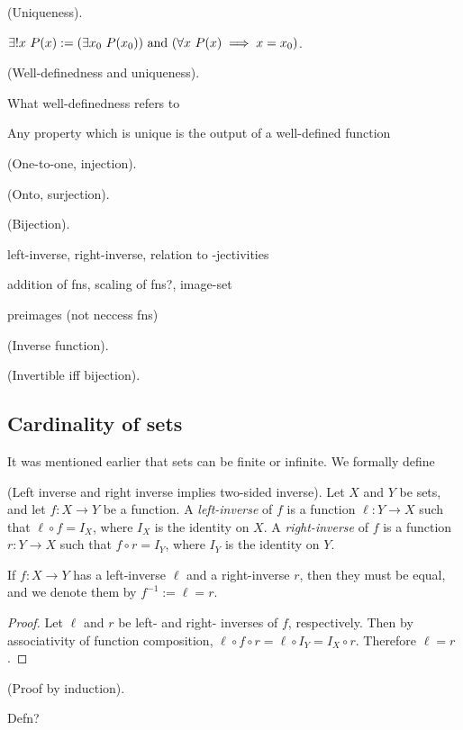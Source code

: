 \begin{defn}
    (Uniqueness).
    
    $\exists !x \text{ } P(x) := (\exists x_0 \text{ } P(x_0)) \text{ and } (\forall x \text{ } P(x) \implies x = x_0)$.
\end{defn}

\begin{remark}
    (Well-definedness and uniqueness).
    
    What well-definedness refers to
    
    Any property which is unique is the output of a well-defined function
\end{remark}

\begin{defn}
    (One-to-one, injection).
\end{defn}

\begin{defn}
    (Onto, surjection).
\end{defn}

\begin{defn}
    (Bijection).
\end{defn}

left-inverse, right-inverse, relation to -jectivities

addition of fns, scaling of fns?, image-set

preimages (not neccess fns)

\begin{defn}
\label{ch::logic_pf_fns::defn::inverse_fn}

    (Inverse function).
\end{defn}

\begin{theorem}
\label{ch::logic_pf_fns::thm::invertible_iff_bijection}
    (Invertible iff bijection).
\end{theorem}

\subsection*{Cardinality of sets}

It was mentioned earlier that sets can be finite or infinite. We formally define

\begin{theorem}
    (Left inverse and right inverse implies two-sided inverse). Let $X$ and $Y$ be sets, and let $f:X \rightarrow Y$ be a function. A \textit{left-inverse} of $f$ is a function $\ell:Y \rightarrow X$ such that $\ell \circ f = I_X$, where $I_X$ is the identity on $X$. A \textit{right-inverse} of $f$ is a function $r:Y \rightarrow X$ such that $f \circ r = I_Y$, where $I_Y$ is the identity on $Y$.
    
    If $f:X \rightarrow Y$ has a left-inverse $\ell$ and a right-inverse $r$, then they must be equal, and we denote them by $f^{-1} := \ell = r$.
\end{theorem}

\begin{proof}
    Let $\ell$ and $r$ be left- and right- inverses of $f$, respectively. Then by associativity of function composition, $\ell \circ f \circ r = \ell \circ I_Y = I_X \circ r$. Therefore $\ell = r$.
\end{proof}

\begin{defn}
    (Proof by induction).
    
    Defn?
\end{defn}
